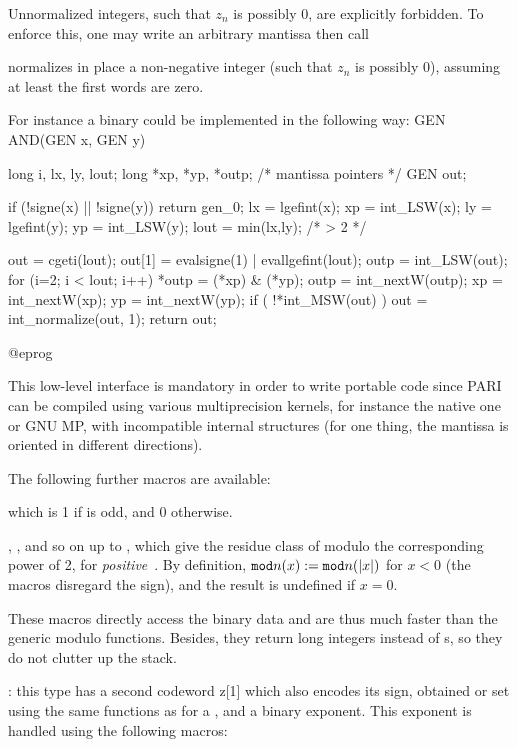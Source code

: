 Unnormalized integers, such that $z_n$ is possibly $0$, are explicitly
forbidden. To enforce this, one may write an arbitrary mantissa then call


\noindent normalizes in place a non-negative integer (such that $z_n$ is
possibly $0$), assuming at least the first  words are zero.

\noindent For instance a binary  could be implemented in the
following way:
\bprog
GEN AND(GEN x, GEN y) {
  long i, lx, ly, lout;
  long *xp, *yp, *outp; /* mantissa pointers */
  GEN out;

  if (!signe(x) || !signe(y)) return gen_0;
  lx = lgefint(x); xp = int_LSW(x);
  ly = lgefint(y); yp = int_LSW(y); lout = min(lx,ly); /* > 2 */

  out = cgeti(lout); out[1] = evalsigne(1) | evallgefint(lout);
  outp = int_LSW(out);
  for (i=2; i < lout; i++)
  {
    *outp = (*xp) & (*yp);
    outp  = int_nextW(outp);
    xp    = int_nextW(xp);
    yp    = int_nextW(yp);
  }
  if ( !*int_MSW(out) ) out = int_normalize(out, 1);
  return out;
}
@eprog

\noindent This low-level interface is mandatory in order to write portable
code since PARI can be compiled using various multiprecision kernels, for
instance the native one or GNU MP, with incompatible internal structures
(for one thing, the mantissa is oriented in different directions).

\noindent The following further macros are available:

 which is 1 if  is odd, and 0 otherwise.

, , and so on up to ,
which give the residue class of  modulo the corresponding power of
2, for \emph{positive}~. By definition, ${\tt mod}n(x) :=
{\tt mod}n(|x|)$ for $x < 0$ (the macros disregard the sign), and the
result is undefined if $x = 0$.

These macros directly access the binary data and are thus much faster than
the generic modulo functions. Besides, they return long integers instead of
s, so they do not clutter up the stack.

:
this type has a second codeword z[1] which also encodes its sign, obtained
or set using the same functions as for a , and a binary exponent.
This exponent is handled using the following macros:

